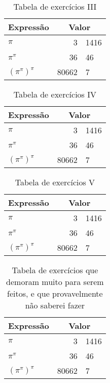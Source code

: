 \documentclass[12pt, a4paper]{article}
\begin{document}
	\lipsum[2]
	
	\begin{table}[htbp]
		\centering	
		\begin{tabular}{lr@{.}l}
			Expressão       & \multicolumn{2}{c}{Valor} \\ \hline
			$\pi$           &     3 & 1416              \\
			$\pi^\pi$       &    36 & 46                \\
			$(\pi^\pi)^\pi$ & 80662 & 7                 \\ \hline
		\end{tabular}
		
		\caption{Tabela de exercícios III}
	\end{table}
	
	\lipsum[3]
	
	\begin{table}[htbp]
		\centering	
		\begin{tabular}{lr@{.}l}
			Expressão       & \multicolumn{2}{c}{Valor} \\ \hline
			$\pi$           &     3 & 1416              \\
			$\pi^\pi$       &    36 & 46                \\
			$(\pi^\pi)^\pi$ & 80662 & 7                 \\ \hline
		\end{tabular}
		
		\caption{Tabela de exercícios IV}
	\end{table}
	
	\lipsum
	
	\begin{table}[htbp]
		\centering	
		\begin{tabular}{lr@{.}l}
			Expressão       & \multicolumn{2}{c}{Valor} \\ \hline
			$\pi$           &     3 & 1416              \\
			$\pi^\pi$       &    36 & 46                \\
			$(\pi^\pi)^\pi$ & 80662 & 7                 \\ \hline
		\end{tabular}
		
		\caption{Tabela de exercícios V}
	\end{table}
	
	\lipsum
	
	\begin{table}[htbp]
		\centering	
		\begin{tabular}{lr@{.}l}
			Expressão       & \multicolumn{2}{c}{Valor} \\ \hline
			$\pi$           &     3 & 1416              \\
			$\pi^\pi$       &    36 & 46                \\
			$(\pi^\pi)^\pi$ & 80662 & 7                 \\ \hline
		\end{tabular}
		
		\caption[Tabela de exercícios VI]{Tabela de exercícios que demoram muito para serem feitos, e que provavelmente não saberei fazer}
	\end{table}
\end{document}
